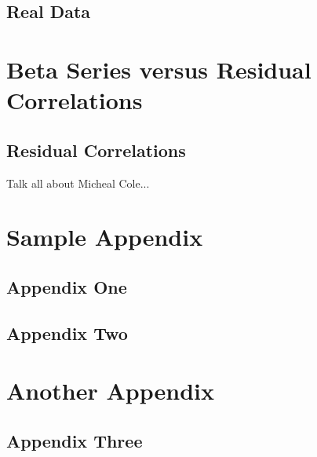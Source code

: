 \documentclass[phd,appendix,figures]{uithesis}
\begin{document}
\section{Real Data}

\chapter{Beta Series versus Residual Correlations}

\section{Residual Correlations}

Talk all about Micheal Cole...



\appendix

\chapter{Sample Appendix}

\section{Appendix One}
\blindtext

\section{Appendix Two}
\blindtext

\chapter{Another Appendix}

\section{Appendix Three}
\blindtext



 
\end{document}
